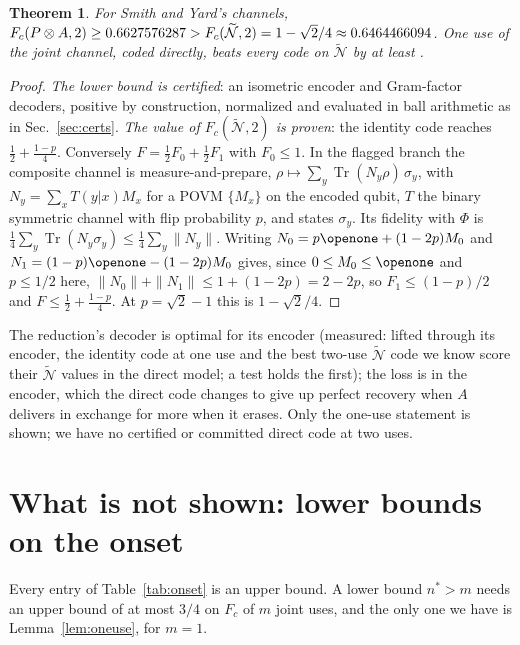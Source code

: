 \documentclass[aps,pra,twocolumn,superscriptaddress,nofootinbib,longbibliography,floatfix]{revtex4-2}
\newtheorem{theorem}{Theorem}
\newcommand{\tr}{\operatorname{Tr}}
\newcommand{\nt}{\widetilde{\mathcal N}}
\newcommand{\mes}{\varPhi}
\begin{document}
\begin{theorem}
\label{thm:direct}
For Smith and Yard's channels, $F_c(P\otimes A,2)\ge\DirectF>F_c(\nt,2)=1-\sqrt2/4\approx\NtOneOpt$. One use of the joint channel, coded directly, beats every code on $\nt$ by at least \DirectGain.
\end{theorem}
\begin{proof}
\emph{The lower bound is certified}: an isometric encoder and Gram-factor decoders, positive by construction, normalized and evaluated in ball arithmetic as in Sec.~\ref{sec:certs}. \emph{The value of $F_c(\nt,2)$ is proven}: the identity code reaches $\frac12+\frac{1-p}4$. Conversely $F=\frac12F_0+\frac12F_1$ with $F_0\le1$. In the flagged branch the composite channel is measure-and-prepare, $\rho\mapsto\sum_y\tr(N_y\rho)\,\sigma_y$, with $N_y=\sum_xT(y|x)M_x$ for a POVM $\{M_x\}$ on the encoded qubit, $T$ the binary symmetric channel with flip probability $p$, and states $\sigma_y$. Its fidelity with $\mes$ is $\frac14\sum_y\tr(N_y\sigma_y)\le\frac14\sum_y\|N_y\|$. Writing $N_0=p\openone+(1-2p)M_0$ and $N_1=(1-p)\openone-(1-2p)M_0$ gives, since $0\le M_0\le\openone$ and $p\le1/2$ here, $\|N_0\|+\|N_1\|\le1+(1-2p)=2-2p$, so $F_1\le(1-p)/2$ and $F\le\frac12+\frac{1-p}4$. At $p=\sqrt2-1$ this is $1-\sqrt2/4$.
\end{proof}
\noindent The reduction's decoder is optimal for its encoder (measured: lifted through its encoder, the identity code at one use and the best two-use $\nt$ code we know score their $\nt$ values in the direct model; a test holds the first); the loss is in the encoder, which the direct code changes to give up perfect recovery when $A$ delivers in exchange for more when it erases. Only the one-use statement is shown; we have no certified or committed direct code at two uses.

\section{What is not shown: lower bounds on the onset}
\label{sec:limits}

Every entry of Table~\ref{tab:onset} is an upper bound. A lower bound $n^*>m$ needs an upper bound of at most $3/4$ on $F_c$ of $m$ joint uses, and the only one we have is Lemma~\ref{lem:oneuse}, for $m=1$.
\end{document}
